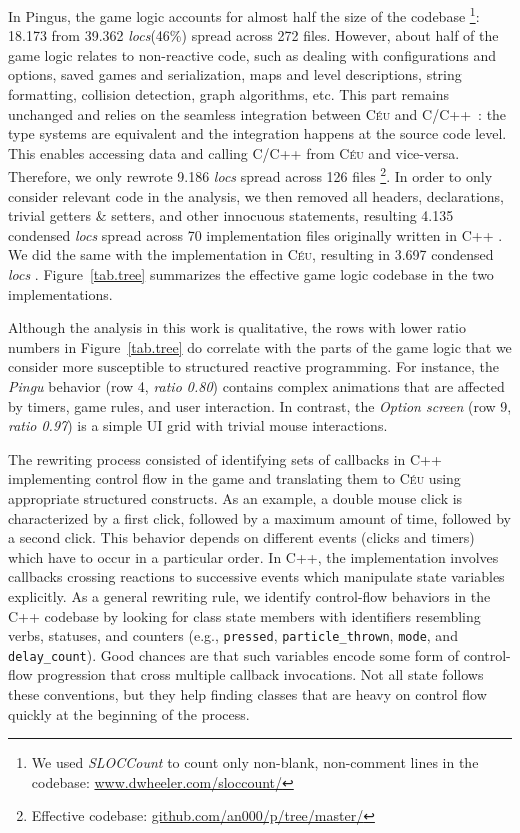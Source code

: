 \documentclass[10pt, conference, compsocconf]{IEEEtran}
\newcommand{\CEU}{\textsc{C\'{e}u}\xspace}
\newcommand{\locs}{\emph{locs}\xspace}
\newcommand{\code}[1] {{\small{\texttt{#1}}}}
\begin{document}
In Pingus, the game logic accounts for almost half the size of the codebase%
\footnote{
We used \emph{SLOCCount} to count only non-blank, non-comment lines in the
codebase: \url{www.dwheeler.com/sloccount/}
}:
18.173 from 39.362 \locs (46\%) spread across 272 files.
%
However, about half of the game logic relates to non-reactive code, such as
dealing with configurations and options, saved games and serialization, maps
and level descriptions, string formatting, collision detection, graph
algorithms, etc.
This part remains unchanged and relies on the seamless integration between \CEU
and C/C++~\cite{ceu.sensys13}: the type systems are equivalent and the
integration happens at the source code level.
This enables accessing data and calling C/C++ from \CEU and vice-versa.
%
Therefore, we only rewrote 9.186 \locs spread across 126 files%
\footnote{\label{codebase} Effective codebase: \url{github.com/an000/p/tree/master/}}.
%
In order to only consider relevant code in the analysis, we then removed all
headers, declarations, trivial getters \& setters, and other innocuous
statements, resulting 4.135 condensed \locs spread across 70 implementation
files originally written in C++%
\footnotemark[\ref{codebase}].
We did the same with the implementation in \CEU, resulting in 3.697 condensed
\locs%
\footnotemark[\ref{codebase}].
%
Figure~\ref{tab.tree} summarizes the effective game logic codebase in the two
implementations.

Although the analysis in this work is qualitative, the rows with lower ratio
numbers in Figure~\ref{tab.tree} do correlate with the parts of the game
logic that we consider more susceptible to structured reactive programming.
For instance, the \emph{Pingu} behavior (row 4, \emph{ratio 0.80}) contains
complex animations that are affected by timers, game rules, and user
interaction.
In contrast, the \emph{Option screen} (row 9, \emph{ratio 0.97}) is a simple UI
grid with trivial mouse interactions.

The rewriting process consisted of identifying sets of callbacks in C++
implementing control flow in the game and translating them to \CEU using
appropriate structured constructs.
%
As an example, a double mouse click is characterized by a first click, followed
by a maximum amount of time, followed by a second click.
This behavior depends on different events (clicks and timers) which have to
occur in a particular order.
In C++, the implementation involves callbacks crossing reactions to successive
events which manipulate state variables explicitly.
%
As a general rewriting rule, we identify control-flow behaviors in the C++
codebase by looking for class state members with identifiers resembling verbs,
statuses, and counters (e.g.,
\code{pressed},
\code{particle\_thrown},
\code{mode}, and
\code{delay\_count}).
Good chances are that such variables encode some form of control-flow
progression that cross multiple callback invocations.
%
Not all state follows these conventions, but they help finding classes that are
heavy on control flow quickly at the beginning of the process.
\end{document}
